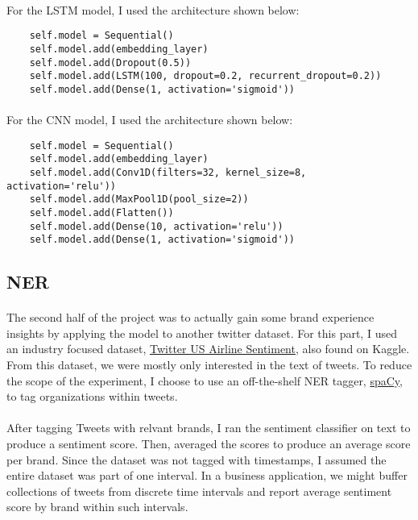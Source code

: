 \documentclass{article}
\begin{document}
\paragraph{} For the LSTM model, I used the architecture shown below:

\begin{verbatim}
    self.model = Sequential()
    self.model.add(embedding_layer)
    self.model.add(Dropout(0.5))
    self.model.add(LSTM(100, dropout=0.2, recurrent_dropout=0.2))
    self.model.add(Dense(1, activation='sigmoid'))
\end{verbatim}

\paragraph{} For the CNN model, I used the architecture shown below:

\begin{verbatim}
    self.model = Sequential()
    self.model.add(embedding_layer)
    self.model.add(Conv1D(filters=32, kernel_size=8, activation='relu'))
    self.model.add(MaxPool1D(pool_size=2))
    self.model.add(Flatten())
    self.model.add(Dense(10, activation='relu'))
    self.model.add(Dense(1, activation='sigmoid'))
\end{verbatim}

\subsection{NER}

\paragraph{} The second half of the project was to actually gain some brand experience insights by applying the model to another twitter dataset. For this part, I used an industry focused dataset, \href{https://www.kaggle.com/crowdflower/twitter-airline-sentiment}{Twitter US Airline Sentiment}, also found on Kaggle. From this dataset, we were mostly only interested in the text of tweets. To reduce the scope of the experiment, I choose to use an off-the-shelf NER tagger, \href{https://spacy.io/}{spaCy}, to tag organizations within tweets.

\paragraph{} After tagging Tweets with relvant brands, I ran the sentiment classifier on text to produce a sentiment score. Then, averaged the scores to produce an average score per brand. Since the dataset was not tagged with timestamps, I assumed the entire dataset was part of one interval. In a business application, we might buffer collections of tweets from discrete time intervals and report average sentiment score by brand within such intervals.
\end{document}
